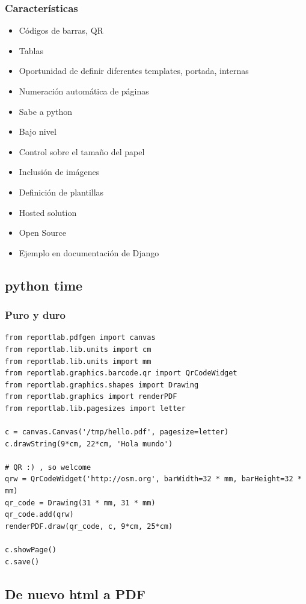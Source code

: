 \documentclass[8pt,xcolor={usenames,dvipsnames}]{beamer}
\begin{document}
\begin{frame}
  \frametitle{Características}
  \begin{itemize}
  \item Códigos de barras, QR
  \item Tablas
  \item Oportunidad de definir diferentes templates, portada, internas
  \item Numeración automática de páginas
  \item Sabe a python
  \item Bajo nivel
  \item Control sobre el tamaño del papel
  \item Inclusión de imágenes
  \item Definición de plantillas
  \item Hosted solution
  \item Open Source
  \item Ejemplo en documentación de Django
  \end{itemize}
\end{frame}

\subsection{python time}
  
\begin{frame}[fragile]
\frametitle{Puro y duro}
\begin{verbatim}
from reportlab.pdfgen import canvas  
from reportlab.lib.units import cm
from reportlab.lib.units import mm
from reportlab.graphics.barcode.qr import QrCodeWidget
from reportlab.graphics.shapes import Drawing
from reportlab.graphics import renderPDF
from reportlab.lib.pagesizes import letter

c = canvas.Canvas('/tmp/hello.pdf', pagesize=letter)  
c.drawString(9*cm, 22*cm, 'Hola mundo')

# QR :) , so welcome
qrw = QrCodeWidget('http://osm.org', barWidth=32 * mm, barHeight=32 * mm)
qr_code = Drawing(31 * mm, 31 * mm)
qr_code.add(qrw)
renderPDF.draw(qr_code, c, 9*cm, 25*cm)

c.showPage()  
c.save()

\end{verbatim}
\end{frame}

\subsection{De nuevo html a PDF}
\end{document}
